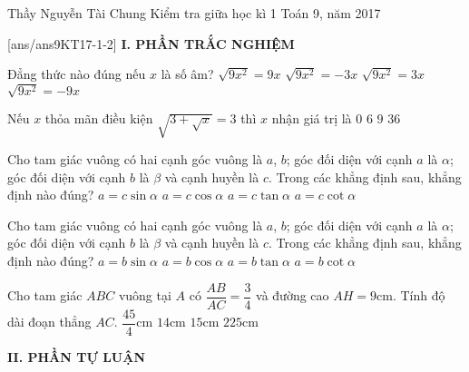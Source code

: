 
\begin{name}
{Thầy  Nguyễn Tài Chung}
{Kiểm tra giữa học kì 1 Toán 9, năm 2017}
\end{name}
[ans/ans9KT17-1-2]
\noindent\textbf{I. PHẦN TRẮC NGHIỆM}
\setcounter{ex}{0}
\begin{ex}%
Đẳng thức nào đúng nếu $x$ là số âm?
	\choice
	{$\sqrt{9x^2}=9x$}
	{\True $\sqrt{9x^2}=-3x$}
	{$\sqrt{9x^2}=3x$}
	{$\sqrt{9x^2}=-9x$}
\end{ex}
\begin{ex}%
Nếu $x$ thỏa mãn điều kiện $\sqrt {3 + \sqrt x }  = 3$ thì $x$ nhận giá trị là 
    \choice
        {$0$}
        {$6$}
        {$9$}
        {\True $36$}
\end{ex}
\begin{ex}%
Cho tam giác vuông có hai cạnh góc vuông là $a$, $b$; góc đối diện với cạnh $a$ là $\alpha$; góc đối diện với cạnh $b$ là $\beta$ và cạnh huyền là $c$. Trong các khẳng định sau, khẳng định nào đúng?
	\choice
	{\True $a=c\sin \alpha$}
	{$a=c\cos \alpha$}
	{$a=c\tan \alpha$}
	{$a=c\cot \alpha$}
\end{ex}
\begin{ex}%
	Cho tam giác vuông có hai cạnh góc vuông là $a$, $b$; góc đối diện với cạnh $a$ là $\alpha$; góc đối diện với cạnh $b$ là $\beta$ và cạnh huyền là $c$. Trong các khẳng định sau, khẳng định nào đúng?
	\choice
	{$a=b\sin \alpha$}
	{$a=b\cos \alpha$}
	{\True $a=b\tan \alpha$}
	{$a=b\cot \alpha$}
\end{ex}
\begin{ex}%
Cho tam giác $ABC$ vuông tại $A$ có $\dfrac{AB}{AC}=\dfrac{3}{4}$ và đường cao $AH=9$cm. Tính độ dài đoạn thẳng $AC$.
	\choice
	{$\dfrac{45}{4}$cm}
	{$14$cm}
	{\True $15$cm}
	{$225$cm}
\end{ex}

\noindent\textbf{II. PHẦN TỰ LUẬN}
\setcounter{ex}{0}


